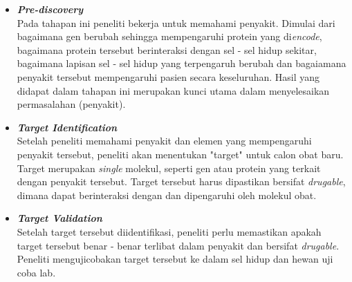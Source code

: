\begin{itemize} 
\item{\textbf{\textit{Pre-discovery}}}
\\Pada tahapan ini peneliti bekerja untuk memahami penyakit. Dimulai dari bagaimana gen berubah sehingga mempengaruhi protein yang di\textit{encode}, bagaimana protein tersebut berinteraksi dengan sel - sel hidup sekitar, bagaimana lapisan sel - sel hidup yang terpengaruh berubah dan bagaiamana penyakit tersebut mempengaruhi pasien secara keseluruhan. Hasil yang didapat dalam tahapan ini merupakan kunci utama dalam menyelesaikan permasalahan (penyakit).


\item{\textbf{\textit{Target Identification}}}
\\Setelah peneliti memahami penyakit dan elemen yang mempengaruhi penyakit tersebut, peneliti akan menentukan "target" untuk calon obat baru. Target merupakan \textit{single} molekul, seperti gen atau protein yang terkait dengan penyakit tersebut. Target tersebut harus dipastikan bersifat \textit{drugable}, dimana dapat berinteraksi dengan dan dipengaruhi oleh molekul obat. 

\item{\textbf{\textit{Target Validation}}}
\\Setelah target tersebut diidentifikasi, peneliti perlu memastikan apakah target tersebut benar - benar terlibat dalam penyakit dan bersifat \textit{drugable}. Peneliti mengujicobakan target tersebut ke dalam sel hidup dan hewan uji coba lab.


\end{itemize}
